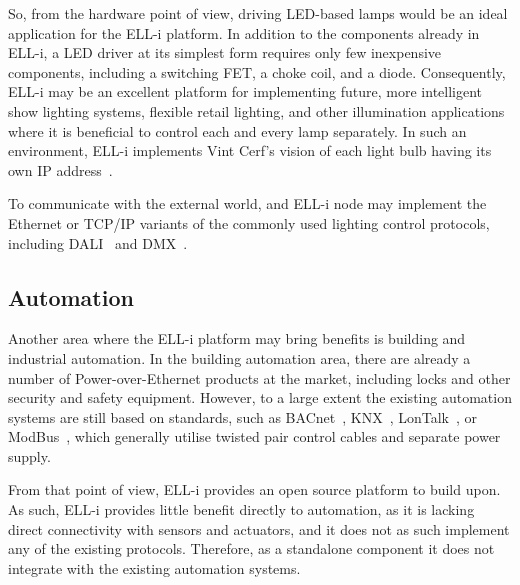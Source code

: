 \documentclass{siamltex}
\begin{document}

So, from the hardware point of view, driving LED-based lamps would be an
ideal application for the ELL-i platform.  In addition to the
components already in ELL-i, a LED driver at its simplest form
requires only few inexpensive components, including a switching
FET, a choke coil, and a diode.
Consequently, ELL-i may be an excellent platform for implementing
future, more intelligent show lighting systems, flexible retail
lighting, and other illumination applications where it is beneficial
to control each and every lamp separately.  In such an environment,
ELL-i implements Vint Cerf's vision of each light bulb having its own
IP address~\cite{cerf1997next}.

To communicate with the external world, and ELL-i node may implement the
Ethernet or TCP/IP variants of the commonly used lighting control protocols,
including DALI~\cite{manual2001digital} and DMX~\cite{bennette1994recommended}.


\subsection{Automation}

Another area where the ELL-i platform may bring benefits is building
and industrial automation.  In the building automation area, there are
already a number of Power-over-Ethernet products at the market,
including locks and other security and safety equipment.  However, to
a large extent the existing automation systems are still based on
standards, such as BACnet~\cite{bushby1997bacnet}, KNX~\cite{knx2011knx},
LonTalk~\cite{LonTalk}, or ModBus~\cite{ModBus},
which generally utilise twisted pair
control cables and separate power supply.

From that point of view, ELL-i provides an open source platform to
build upon.  As such, ELL-i provides little benefit directly to
automation, as it is lacking direct connectivity with sensors and
actuators, and it does not as such implement any of the existing
protocols.  Therefore, as a standalone component it does not integrate
with the existing automation systems.
\end{document}
